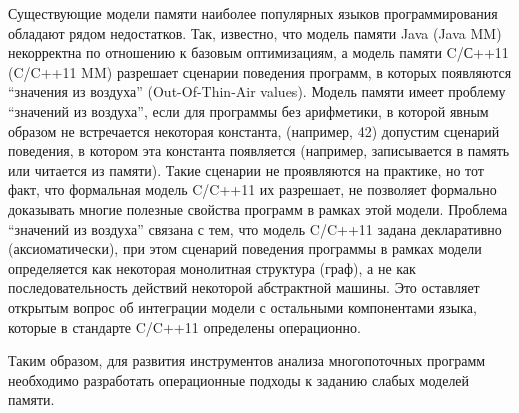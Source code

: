 Существующие модели памяти наиболее популярных языков программирования обладают рядом недостатков.
Так, известно, что модель памяти Java (Java MM)  некорректна по отношению
к базовым оптимизациям, а модель памяти C/С++11 (C/C++11 MM)  разрешает
сценарии поведения программ, в которых появляются ``значения из воздуха'' (Out-Of-Thin-Air values).
Модель памяти имеет проблему ``значений из воздуха'', если для программы без арифметики,
в которой явным образом не встречается некоторая константа, (например, 42) допустим сценарий поведения,
в котором эта константа появляется (например, записывается в память или читается из памяти).
Такие сценарии не проявляются на практике, но тот факт,
что формальная модель C/C++11 их разрешает, не позволяет формально доказывать многие полезные свойства программ в рамках этой модели.
Проблема ``значений из воздуха'' связана с тем, что модель C/C++11 задана декларативно (аксиоматически), при этом  сценарий поведения программы
в рамках модели определяется как некоторая монолитная структура (граф), а не как последовательность действий некоторой
абстрактной машины.
Это оставляет открытым вопрос об интеграции модели с остальными компонентами языка, которые в стандарте C/C++11 определены
операционно.

Таким образом, для развития инструментов анализа многопоточных программ необходимо
разработать операционные подходы к заданию слабых моделей памяти.



